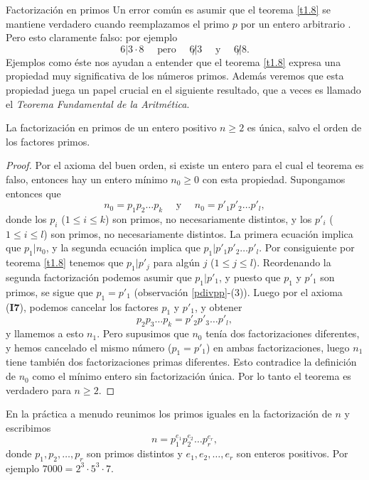 \begin{section}{Factorización en primos}
Un error común es asumir que el teorema \ref{t1.8} se mantiene verdadero cuando reemplazamos el primo $p$ por un entero arbitrario . Pero esto claramente falso: por ejemplo 
$$
6| 3\cdot 8 \quad \text{ pero } \quad 6{\not|} 3 \quad \text{ y }\quad 6{\not|}8.
$$
Ejemplos como éste nos ayudan a entender que el teorema \ref{t1.8} expresa una propiedad muy significativa de los números primos. Además veremos que esta propiedad juega un papel crucial en el siguiente resultado, que a veces es llamado el \textit{Teorema Fundamental de la Aritmética}. 

\begin{teorema}\label{t1.8.2} La factorización en primos de un entero positivo $n\ge 2$ es única, salvo el orden de los factores primos.
\end{teorema}
\begin{proof} Por el axioma del buen orden, si existe un entero para el cual el teorema es falso, entonces hay un entero mínimo $n_0\ge 0$ con esta propiedad. Supongamos entonces que 
$$
n_0= p_1p_2\ldots p_k\quad\text{ y }\quad n_0= p'_1p'_2\ldots p'_l,
$$
donde los $p_i$ ($1\le i \le k$) son primos, no necesariamente distintos, y los $p'_i$ ($1\le i \le l$) son primos, no necesariamente distintos. La primera ecuación implica que $p_1|n_0$, y la segunda ecuación implica que $p_1 | p'_1p'_2\ldots p'_l$. Por consiguiente por teorema \ref{t1.8} tenemos que $p_1|p'_j$ para algún $j$ ($1\le j \le l$). Reordenando la segunda factorización podemos asumir que $p_1 | p'_1$, y puesto que $p_1$ y $p'_1$ son primos, se sigue que $p_1=p'_1$ (observación \ref{pdivpp}-(3)). Luego por el axioma (\textbf{I7}), podemos cancelar los factores $p_1$ y $p'_1$, y obtener
$$
p_2p_3 \ldots p_k = p'_2p'_3 \ldots p'_l,
$$
y llamemos a esto $n_1$. Pero supusimos que $n_0$ tenía dos factorizaciones diferentes, y hemos cancelado el mismo número ($p_1=p'_1$) en ambas factorizaciones, luego $n_1$ tiene también dos factorizaciones primas diferentes. Esto contradice la definición de $n_0$ como el mínimo entero sin factorización única. Por lo tanto el teorema es verdadero para $n\ge 2$.
\end{proof}

En la práctica a menudo reunimos los primos iguales en la factorización de $n$ y escribimos
\begin{equation*}
n=p_1^{e_1}p_2^{e_2}\ldots p_r^{e_r},
\end{equation*}
donde $p_1,p_2,\ldots ,p_r$ son primos distintos y $e_1,e_2,\ldots,e_r$ son enteros positivos. Por ejemplo $ 7000 = 2^3 \cdot 5^3 \cdot 7$.


\end{section}
